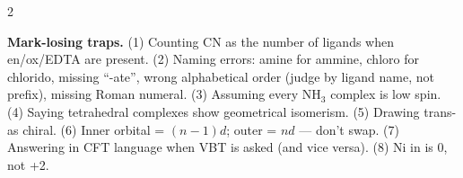 \documentclass[10pt,a4paper]{extarticle}
\begin{document}
\begin{multicols}{2}
\begin{tip}\Tip \textbf{Mark-losing traps.} (1) Counting CN as the number of ligands when en/ox/EDTA are present. (2) Naming errors: amine for ammine, chloro for chlorido, missing ``-ate'', wrong alphabetical order (judge by ligand name, not prefix), missing Roman numeral. (3) Assuming every NH$_3$ complex is low spin. (4) Saying tetrahedral complexes show geometrical isomerism. (5) Drawing trans-\ce{[CoCl2(en)2]+} as chiral. (6) Inner orbital = $(n-1)d$; outer = $nd$ — don't swap. (7) Answering in CFT language when VBT is asked (and vice versa). (8) Ni in \ce{[Ni(CO)4]} is 0, not +2.\end{tip}
\end{multicols}
\begin{tcolorbox}[enhanced,colback=white,colframe=uc,boxrule=0.6pt,arc=2pt,title={\sffamily\bfseries\footnotesize My notes — Ch 5 Coordination Compounds},colbacktitle=uc,coltitle=white,height fill,before skip=4pt]
\end{tcolorbox}
\end{document}
